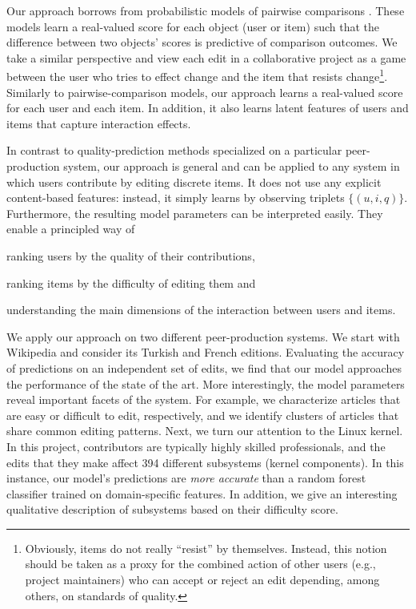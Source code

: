 \documentclass[format=sigconf]{acmart}
\begin{document}
Our approach borrows from probabilistic models of pairwise comparisons \citep{zermelo1928berechnung, rasch1960probabilistic}.
These models learn a real-valued score for each object (user or item) such that the difference between two objects' scores is predictive of comparison outcomes.
We take a similar perspective and view each edit in a collaborative project as a game between the user who tries to effect change and the item that resists change\footnote{Obviously, items do not really ``resist'' by themselves.
Instead, this notion should be taken as a proxy for the combined action of other users (e.g., project maintainers) who can accept or reject an edit depending, among others, on standards of quality.}.
Similarly to pairwise-comparison models, our approach learns a real-valued score for each user and each item.
In addition, it also learns latent features of users and items that capture interaction effects.

In contrast to quality-prediction methods specialized on a particular peer-production system, our approach is general and can be applied to any system in which users contribute by editing discrete items.
It does not use any explicit content-based features: instead, it simply learns by observing triplets $\{ (u, i, q) \}$.
Furthermore, the resulting model parameters can be interpreted easily.
They enable a principled way of
\begin{enuminline}
\item ranking users by the quality of their contributions,
\item ranking items by the difficulty of editing them and
\item understanding the main dimensions of the interaction between users and items.
\end{enuminline}

We apply our approach on two different peer-production systems.
We start with Wikipedia and consider its Turkish and French editions.
Evaluating the accuracy of predictions on an independent set of edits, we find that our model approaches the performance of the state of the art.
More interestingly, the model parameters reveal important facets of the system.
For example, we characterize articles that are easy or difficult to edit, respectively, and we identify clusters of articles that share common editing patterns.
Next, we turn our attention to the Linux kernel.
In this project, contributors are typically highly skilled professionals, and the edits that they make affect \num{394} different subsystems (kernel components).
In this instance, our model's predictions are \emph{more accurate} than a random forest classifier trained on domain-specific features.
In addition, we give an interesting qualitative description of subsystems based on their difficulty score.
\end{document}
